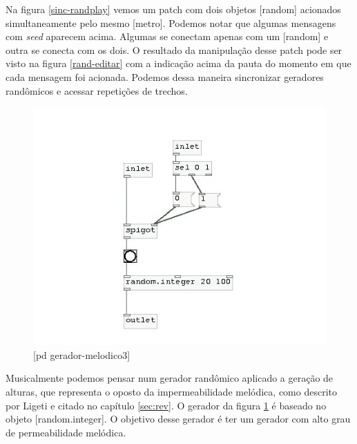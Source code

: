 \documentclass{ppgmus}
\begin{document}

Na figura \ref{sinc-randplay} vemos um patch com dois objetos [random] acionados simultaneamente
pelo mesmo [metro]. Podemos notar que algumas mensagens com \textit{seed} aparecem acima. Algumas se conectam 
apenas com um [random] e outra se conecta com os dois. O resultado da manipulação desse patch pode ser 
visto na figura \ref{rand-editar} com a indicação acima da pauta do momento em que cada mensagem foi acionada.
Podemos dessa maneira sincronizar geradores randômicos e acessar repetições de trechos.


\begin{figure}
\includegraphics[scale=.6]{gera-melodico3}
\caption{[pd gerador-melodico3]}
\label{gera-melodico3}
\end{figure}  

Musicalmente podemos pensar num gerador randômico aplicado a geração de alturas, 
que representa o oposto da impermeabilidade melódica, como descrito por Ligeti e citado
no capítulo \ref{sec:rev}.
O gerador da figura \ref{gera-melodico3} é baseado no 
objeto [random.integer]. O objetivo desse gerador é 
ter um gerador com alto grau de permeabilidade melódica.
\end{document}
